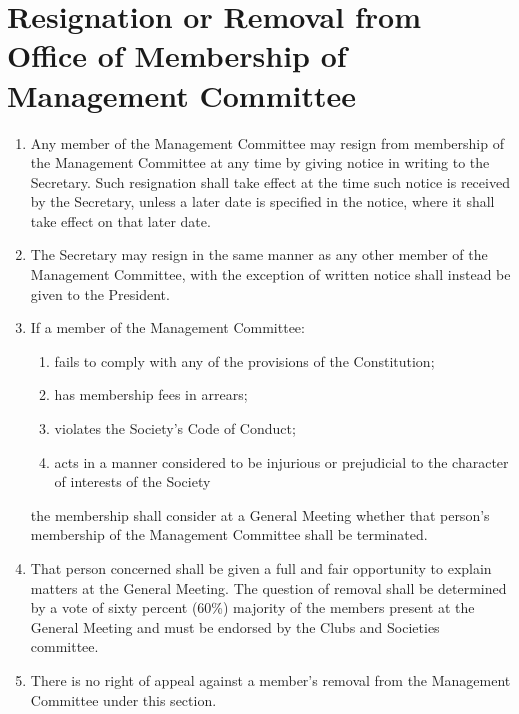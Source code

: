 \documentclass[a4paper]{article}
\begin{document}
\section{Resignation or Removal from Office of Membership of Management Committee}
\begin{enumerate}
\item Any member of the Management Committee may resign from membership of the Management Committee at any time by giving notice in writing to the Secretary. Such resignation shall take effect at the time such notice is received by the Secretary, unless a later date is specified in the notice, where it shall take effect on that later date.
\item The Secretary may resign in the same manner as any other member of the Management Committee, with the exception of written notice shall instead be given to the President.
\item If a member of the Management Committee:
	\begin{enumerate}
	\item fails to comply with any of the provisions of the Constitution;
	\item has membership fees in arrears;
	\item violates the Society's Code of Conduct;
	\item acts in a manner considered to be injurious or prejudicial to the character of interests of the Society
	\end{enumerate}
the membership shall consider at a General Meeting whether that person's membership of the Management Committee shall be terminated.
\item That person concerned shall be given a full and fair opportunity to explain matters at the General Meeting. The question of removal shall be determined by a vote of sixty percent (60\%) majority of the members present at the General Meeting and must be endorsed by the Clubs and Societies committee.
\item There is no right of appeal against a member's removal from the Management Committee under this section.
\end{enumerate}
\end{document}
